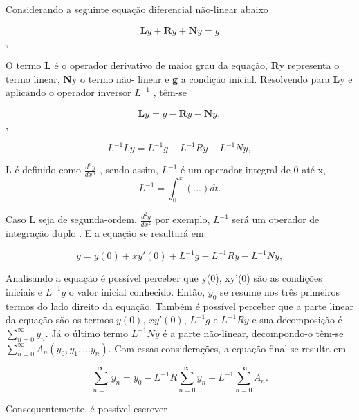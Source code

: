  
 Considerando a seguinte equação diferencial não-linear abaixo
 
 \begin{equation}  \textbf{L}y +  \textbf{R}y +  \textbf{N}y = g\end{equation},

O termo \textbf{L} é o operador derivativo de maior grau da equação, \textbf{R}y representa o termo linear, \textbf{N}y o termo não- linear e \textbf{g} a condição inicial. Resolvendo para \textbf{L}y  e aplicando o operador inversor $L^{-1}$ , têm-se

 \begin{equation}  \textbf{L}y =  g - \textbf{R}y - \textbf{N}y,\end{equation},
 
  
  \begin{equation}
L^{-1}Ly =  L^{-1}g -  L^{-1}Ry -  L^{-1}Ny,
  \end{equation}
  
  L é definido como $\frac{d^ny }{d x^n}$ , sendo assim, $L^{-1}$ é um operador integral de 0 até x,
  \begin{equation}
  L^{-1}= \int_0^{x} (...) dt.
  \end{equation}
  
  Caso L seja de segunda-ordem, $\frac{d^2y}{d x^2}$ por exemplo, $L^{-1}$ será um operador de integração duplo . E a equação se resultará em
  
  \begin{equation}
  y= y(0) + xy'(0) + L^{-1}g - L^{-1}Ry - L^{-1}Ny,
  \end{equation}

Analisando a equação é possível perceber que y(0), xy'(0) são as condições iniciais e $L^{-1}g$ o valor inicial conhecido. Então, $y_{0}$ se resume nos três primeiros termos do lado direito da equação. Também é possível perceber que a parte linear da equação são os termos $y(0)$, $xy'(0)$, $L^{-1}g$ e $L^{-1}Ry$ e sua decomposição é $\sum_{n=0}^{\infty} y_{n}$. Já  o último termo $L^{-1}Ny$ é a parte não-linear, decompondo-o têm-se $\sum_{n=0}^{\infty} A_{n}(y_{0},y_{1},...y_{n})$. Com essas considerações, a equação final se resulta em
 
 \begin{equation}
 \sum_{n=0}^{\infty} y_{n} = y_{0} - L^{-1}R \sum_{n=0}^{\infty} y_{n} - L^{-1}\sum_{n=0}^{\infty} A_{n}.
 \end{equation}
 
 Consequentemente, é possível escrever
 
